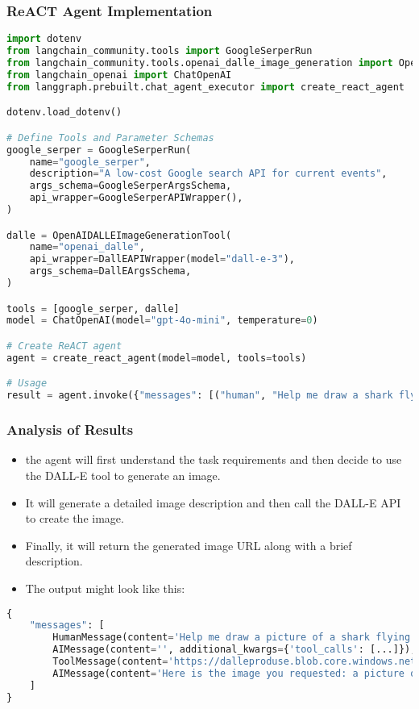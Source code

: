 \begin{frame}[fragile]\frametitle{ReACT Agent Implementation}
      \begin{lstlisting}[language=Python, basicstyle=\tiny]
import dotenv
from langchain_community.tools import GoogleSerperRun
from langchain_community.tools.openai_dalle_image_generation import OpenAIDALLEImageGenerationTool
from langchain_openai import ChatOpenAI
from langgraph.prebuilt.chat_agent_executor import create_react_agent

dotenv.load_dotenv()

# Define Tools and Parameter Schemas
google_serper = GoogleSerperRun(
    name="google_serper",
    description="A low-cost Google search API for current events",
    args_schema=GoogleSerperArgsSchema,
    api_wrapper=GoogleSerperAPIWrapper(),
)

dalle = OpenAIDALLEImageGenerationTool(
    name="openai_dalle",
    api_wrapper=DallEAPIWrapper(model="dall-e-3"),
    args_schema=DallEArgsSchema,
)

tools = [google_serper, dalle]
model = ChatOpenAI(model="gpt-4o-mini", temperature=0)

# Create ReACT agent
agent = create_react_agent(model=model, tools=tools)

# Usage
result = agent.invoke({"messages": [("human", "Help me draw a shark flying in the sky")]})
      \end{lstlisting}
\end{frame}

\begin{frame}[fragile]\frametitle{Analysis of Results}

      \begin{itemize}
        \item the agent will first understand the task requirements and then decide to use the DALL-E tool to generate an image. 
		\item It will generate a detailed image description and then call the DALL-E API to create the image. 
        \item Finally, it will return the generated image URL along with a brief description.
		\item The output might look like this:
      \end{itemize}



      \begin{lstlisting}[language=Python, basicstyle=\tiny]
{
    "messages": [
        HumanMessage(content='Help me draw a picture of a shark flying in the sky'),
        AIMessage(content='', additional_kwargs={'tool_calls': [...]}),
        ToolMessage(content='https://dalleproduse.blob.core.windows.net/...'),
        AIMessage(content='Here is the image you requested: a picture of a shark flying in the sky. You can view the image by clicking the link below.\n\n![Shark flying in the sky](https://dalleproduse.blob.core.windows.net/...)')
    ]
}
      \end{lstlisting}
\end{frame}




